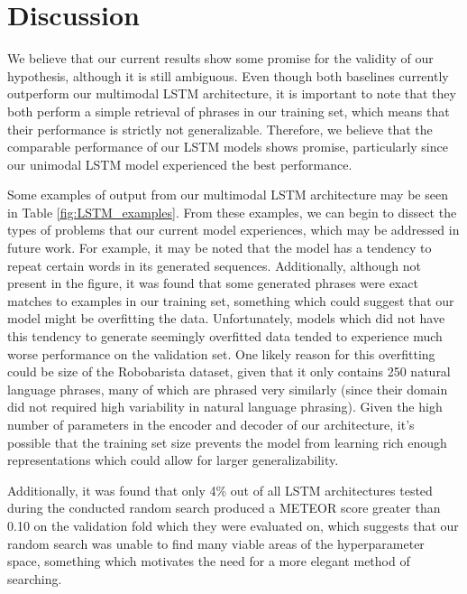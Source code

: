\documentclass[letterpaper, 12 pt, conference]{ieeeconf}
\begin{document}
\section{Discussion}\label{Discussion}

We believe that our current results show some promise for the validity of our hypothesis, although it is still ambiguous. Even though both baselines currently outperform our multimodal LSTM architecture, it is important to note that they both perform a simple retrieval of phrases in our training set, which means that their performance is strictly not generalizable. Therefore, we believe that the comparable performance of our LSTM models shows promise, particularly since our unimodal LSTM model experienced the best performance. 

Some examples of output from our multimodal LSTM architecture may be seen in Table \ref{fig:LSTM_examples}. From these examples, we can begin to dissect the types of problems that our current model experiences, which may be addressed in future work. For example, it may be noted that the model has a tendency to repeat certain words in its generated sequences. Additionally, although not present in the figure, it was found that some generated phrases were exact matches to examples in our training set, something which could suggest that our model might be overfitting the data. Unfortunately, models which did not have this tendency to generate seemingly overfitted data tended to experience much worse performance on the validation set. One likely reason for this overfitting could be size of the Robobarista dataset, given that it only contains 250 natural language phrases, many of which are phrased very similarly (since their domain did not required high variability in natural language phrasing). Given the high number of parameters in the encoder and decoder of our architecture, it's possible that the training set size prevents the model from learning rich enough representations which could allow for larger generalizability. 

Additionally, it was found that only 4\% out of all LSTM architectures tested during the conducted random search produced a METEOR score greater than 0.10 on the validation fold which they were evaluated on, which suggests that our random search was unable to find many viable areas of the hyperparameter space, something which motivates the need for a more elegant method of searching. 
\end{document}

